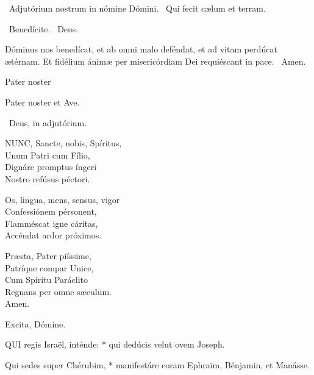 \V\ Adjutórium nostrum in nómine Dómini. \R\ Qui fecit cælum et terram.

\V\ Benedícite. \R\ Deus.

 Dóminus nos benedícat, et ab omni malo deféndat, et ad vitam perdúcat ætérnam. Et fidélium ánimæ per misericórdiam Dei requiéscant in pace. \R\ Amen.

 Pater noster 


Pater noster et Ave.

\V\ Deus, in adjutórium.


\lettrine[lines=2]{N}{UNC}, Sancte, nobis, Spíritus,\\
Unum Patri cum Fílio,\\
Dignáre promptus íngeri\\
Nostro refúsus péctori.

Os, lingua, mens, sensus, vigor\\
Confessiónem pérsonent,\\
Flamméscat igne cáritas,\\
Accéndat ardor próximos.

Præsta, Pater piíssime,\\
Patríque compar Unice,\\
Cum Spíritu Paráclito\\
Regnans per omne sæculum.\\
Amen.

 Excita, Dómine.


\lettrine[lines=2]{Q}{UI} regis Israël, inténde: * qui dedúcis velut ovem Joseph.

Qui sedes super Chérubim, * manifestáre coram Ephraïm, Bénjamin, et Manásse.

